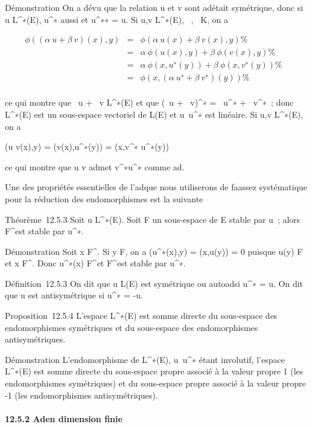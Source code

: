 \documentclass[]{article}
\begin{document}
Démonstration On a dé vu que la relation u et v sont ad\jmathoints était
symétrique, donc si u \in L^∗(E), u^∗ aussi et
u^∗∗ = u. Si u,v \in L^∗(E), \alpha~,\beta~ \in K, on a

\begin{align*} \phi((\alpha~u + \beta~v)(x),y)& =& \phi(\alpha~u(x) +
\beta~v(x),y) \%& \\ & =& \alpha~\phi(u(x),y) +
\beta~\phi(v(x),y) \%& \\ & =&
\alpha~\phi(x,u^∗(y)) + \beta~\phi(x,v^∗(y))\%&
\\ & =& \phi(x,(\alpha~u^∗ +
\beta~v^∗)(y)) \%& \\
\end{align*}

ce qui montre que \alpha~u + \beta~v \in L^∗(E) et que (\alpha~u +
\beta~v)^∗ = \alpha~u^∗ + \beta~v^∗~; donc
L^∗(E) est un sous-espace vectoriel de L(E) et
u\mapsto~u^∗ est linéaire. Si u,v \in
L^∗(E), on a

\phi(u \cdot v(x),y) = \phi(v(x),u^∗(y)) = \phi(x,v^∗\cdot
u^∗(y))

ce qui montre que u \cdot v admet v^∗\cdot u^∗ comme
ad\jmathoint.

Une des propriétés essentielles de l'ad\jmathoint que nous utiliserons de
fa\ccon assez systématique pour la réduction des
endomorphismes est la suivante

Théorème~12.5.3 Soit u \in L^∗(E). Soit F un sous-espace de E
stable par u~; alors F^\bot est stable par u^∗.

Démonstration Soit x \in F^\bot. Si y \in F, on a
\phi(u^∗(x),y) = \phi(x,u(y)) = 0 puisque u(y) \in F et x \in
F^\bot. Donc u^∗(x) \in F^\bot et
F^\bot est stable par u^∗.

Définition~12.5.3 On dit que u \in L(E) est symétrique ou autoad\jmathoint si
u^∗ = u. On dit que u est antisymétrique si u^∗ =
-u.

Proposition~12.5.4 L'espace L^∗(E) est somme directe du
sous-espace des endomorphismes symétriques et du sous-espace des
endomorphismes antisymétriques.

Démonstration L'endomorphisme de L^∗(E),
u\mapsto~u^∗ étant involutif, l'espace
L^∗(E) est somme directe du sous-espace propre associé à la
valeur propre 1 (les endomorphismes symétriques) et du sous-espace
propre associé à la valeur propre -1 (les endomorphismes
antisymétriques).

\paragraph{12.5.2 Ad\jmathoint en dimension finie}
\end{document}
